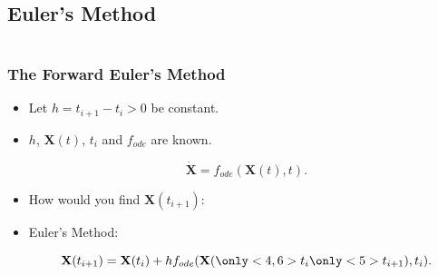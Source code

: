 \documentclass{beamer}
\begin{document}
\subsection{Euler's Method}

\begin{frame}
\begin{columns}
\begin{column}{0.5\linewidth}
\frametitle{The Forward Euler's Method}
\begin{itemize}
\item<1-> Let $h=t_{i+1}-t_i>0$ be constant.

\item<2-> $h$, $\mathbf{X}(t)$, $t_i$ and $f_{ode}$ are known.

\begin{equation*}
\dot{\mathbf{X}} = f_{ode}(\mathbf{X}(t),t).
\end{equation*}

\item<3-> How would you find $\mathbf{X}(t_{i+1})$:

\item<4->  Euler's Method:

\begin{equation*}
\mathbf{X}(t_{i+1}) = \mathbf{X}(t_{i})+h f_{ode}(\mathbf{X}(\only<4,6>{t_i}\only<5>{t_{i+1}}),t_i).
\end{equation*}



\end{itemize}
\end{column}
\end{columns}
\end{frame}
\end{document}
